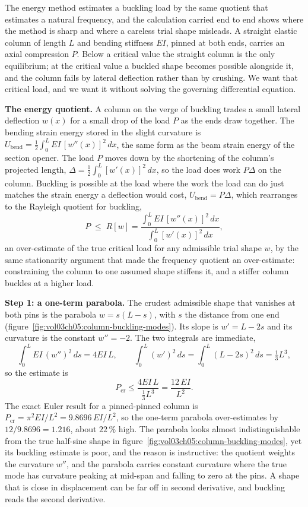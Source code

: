 The energy method estimates a buckling load by the same quotient that
estimates a natural frequency, and the calculation carried end to end shows
where the method is sharp and where a careless trial shape misleads. A
straight elastic column of length $L$ and bending stiffness $EI$, pinned at
both ends, carries an axial compression $P$. Below a critical value the
straight column is the only equilibrium; at the critical value a buckled
shape becomes possible alongside it, and the column fails by lateral
deflection rather than by crushing. We want that critical load, and we want
it without solving the governing differential equation.

\textbf{The energy quotient.} A column on the verge of buckling trades a
small lateral deflection $w(x)$ for a small drop of the load $P$ as the ends
draw together. The bending strain energy stored in the slight curvature is
$U_\text{bend} = \tfrac12\int_0^L EI\,[w''(x)]^2\,dx$, the same form as the
beam strain energy of the section opener. The load $P$ moves down by the
shortening of the column's projected length, $\Delta = \tfrac12\int_0^L
[w'(x)]^2\,dx$, so the load does work $P\Delta$ on the column. Buckling is
possible at the load where the work the load can do just matches the strain
energy a deflection would cost, $U_\text{bend} = P\Delta$, which rearranges
to the Rayleigh quotient for buckling,
\[
P \;\le\; R[w]
= \frac{\displaystyle\int_0^L EI\,[w''(x)]^2\,dx}
       {\displaystyle\int_0^L [w'(x)]^2\,dx},
\]
an over-estimate of the true critical load for any admissible trial shape
$w$, by the same stationarity argument that made the frequency quotient an
over-estimate: constraining the column to one assumed shape stiffens it, and
a stiffer column buckles at a higher load.



\textbf{Step 1: a one-term parabola.} The crudest admissible shape that
vanishes at both pins is the parabola $w = s(L-s)$, with $s$ the distance
from one end (figure~\ref{fig:vol03ch05:column-buckling-modes}). Its slope is
$w' = L - 2s$ and its curvature is the constant $w'' = -2$. The two integrals
are immediate,
\[
\int_0^L EI\,(w'')^2\,ds = 4EI\,L,
\qquad
\int_0^L (w')^2\,ds = \int_0^L (L - 2s)^2\,ds = \tfrac13 L^3,
\]
so the estimate is
\[
P_\text{cr} \le \frac{4EI\,L}{\tfrac13 L^3} = \frac{12\,EI}{L^2}.
\]
The exact Euler result for a pinned-pinned column is $P_\text{cr} = \pi^2
EI/L^2 = 9.8696\,EI/L^2$, so the one-term parabola over-estimates by
$12/9.8696 = 1.216$, about $22\,\%$ high. The parabola looks almost
indistinguishable from the true half-sine shape in
figure~\ref{fig:vol03ch05:column-buckling-modes}, yet its buckling estimate
is poor, and the reason is instructive: the quotient weights the curvature
$w''$, and the parabola carries constant curvature where the true mode has
curvature peaking at mid-span and falling to zero at the pins. A shape that
is close in displacement can be far off in second derivative, and buckling
reads the second derivative.

